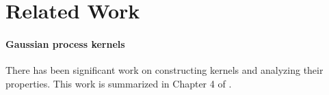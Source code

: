 \documentclass[twoside]{article}
\begin{document}






\section{Related Work}
\label{sec:related_work}


\paragraph{Gaussian process kernels} There has been significant work on constructing \gp{} kernels and analyzing their properties. This work is summarized in Chapter 4 of \cite{rasmussen38gaussian}. 
\end{document}
